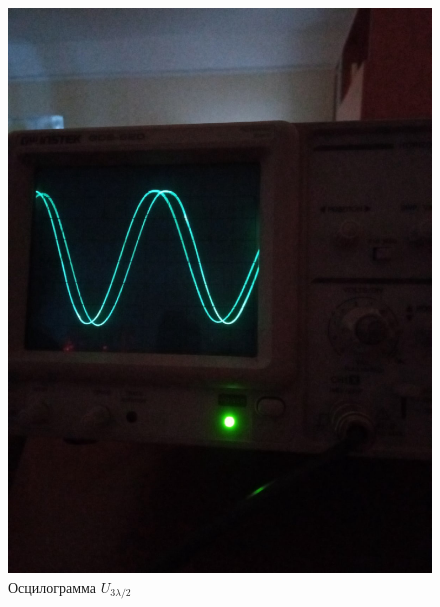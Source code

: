 \documentclass[a4paper, 12pt]{article}
\begin{document}
\begin{enumerate}
    \begin{figure}
        \includegraphics[scale=0.3]{pic3.jpg}
        \centering
        \caption{Осцилограмма $U_{3\lambda / 2}$}
        \label{pic3}
    \end{figure}
\end{enumerate}
\end{document}
